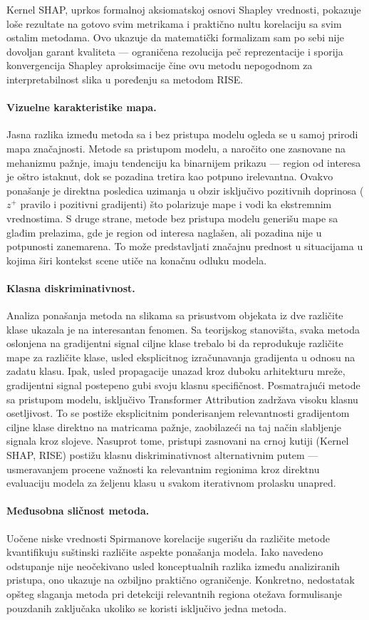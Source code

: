 Kernel SHAP, uprkos formalnoj aksiomatskoj osnovi Shapley vrednosti, 
pokazuje loše rezultate na gotovo svim metrikama i praktično nultu 
korelaciju sa svim ostalim metodama. Ovo ukazuje da matematički 
formalizam sam po sebi nije dovoljan garant kvaliteta — ograničena 
rezolucija peč reprezentacije i sporija konvergencija Shapley aproksimacije čine ovu metodu nepogodnom za interpretabilnost slika u poređenju sa metodom RISE.

\paragraph{Vizuelne karakteristike mapa.}
Jasna razlika između metoda sa i bez pristupa modelu ogleda se u samoj prirodi mapa značajnosti. Metode sa pristupom modelu, a naročito one zasnovane na mehanizmu pažnje, imaju tendenciju ka binarnijem prikazu — region od interesa je oštro istaknut, dok se pozadina tretira kao potpuno irelevantna. Ovakvo ponašanje je direktna posledica uzimanja u obzir isključivo pozitivnih doprinosa ($z^+$  pravilo i pozitivni gradijenti) što polarizuje mape i vodi ka ekstremnim vrednostima. S druge strane, metode bez pristupa modelu generišu mape sa glađim prelazima, gde je region od interesa naglašen, ali pozadina nije u potpunosti zanemarena. To može predstavljati značajnu prednost u situacijama u kojima širi kontekst scene utiče na konačnu odluku modela.

\paragraph{Klasna diskriminativnost.} 
Analiza ponašanja metoda na slikama sa prisustvom objekata iz dve različite klase ukazala je na interesantan fenomen. Sa teorijskog stanovišta, svaka metoda oslonjena na gradijentni signal ciljne klase trebalo bi da reprodukuje različite mape za različite klase, usled eksplicitnog izračunavanja gradijenta u odnosu na zadatu klasu. Ipak, usled propagacije unazad kroz duboku arhitekturu mreže, gradijentni signal postepeno gubi svoju klasnu specifičnost. Posmatrajući metode sa pristupom modelu, isključivo Transformer Attribution zadržava visoku klasnu osetljivost. To se postiže eksplicitnim ponderisanjem relevantnosti gradijentom ciljne klase direktno na matricama pažnje, zaobilazeći na taj način slabljenje signala kroz slojeve. Nasuprot tome, pristupi zasnovani na crnoj kutiji (Kernel SHAP, RISE) postižu klasnu diskriminativnost alternativnim putem — usmeravanjem procene važnosti ka relevantnim regionima kroz direktnu evaluaciju modela za željenu klasu u svakom iterativnom prolasku unapred.

\paragraph{Međusobna sličnost metoda.} 
Uočene niske vrednosti Spirmanove korelacije sugerišu da različite metode kvantifikuju suštinski različite aspekte ponašanja modela. Iako navedeno odstupanje nije neočekivano usled konceptualnih razlika između analiziranih pristupa, ono ukazuje na ozbiljno praktično ograničenje. Konkretno, nedostatak opšteg slaganja metoda pri detekciji relevantnih regiona otežava formulisanje pouzdanih zaključaka ukoliko se koristi isključivo jedna metoda.